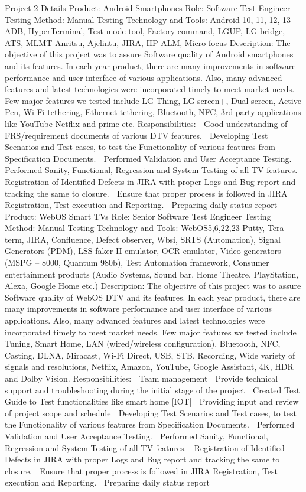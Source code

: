 Project 2 Details
Product: Android Smartphones Role: Software Test Engineer Testing Method: Manual Testing
Technology and Tools: Android 10, 11, 12, 13 ADB, HyperTerminal, Test mode tool, Factory command, LGUP, LG bridge, ATS, MLMT Anritsu, Ajelintu, JIRA, HP ALM, Micro focus
Description:
The objective of this project was to assure Software quality of Android smartphones and its features. In each year product, there are many improvements in software performance and user interface of various applications. Also, many advanced features and latest technologies were incorporated timely to meet market needs.
Few major features we tested include LG Thing, LG screen+, Dual screen, Active Pen, Wi-Fi tethering, Ethernet tethering, Bluetooth, NFC, 3rd party applications like YouTube Netflix and prime etc.
Responsibilities:
 Good understanding of FRS/requirement documents of various DTV features.
 Developing Test Scenarios and Test cases, to test the Functionality of various features from Specification Documents.
 Performed Validation and User Acceptance Testing.
 Performed Sanity, Functional, Regression and System Testing of all TV features.
 Registration of Identified Defects in JIRA with proper Logs and Bug report and tracking the same to closure.
 Ensure that proper process is followed in JIRA Registration, Test execution and Reporting.
 Preparing daily status report
Product: WebOS Smart TVs
Role: Senior Software Test Engineer
Testing Method: Manual Testing
Technology and Tools: WebOS5,6,22,23 Putty, Tera term, JIRA, Confluence, Defect observer, Wbsi, SRTS (Automation), Signal Generators (PDM), LSS faker II emulator, OCR emulator, Video generators (MSPG – 8000, Quantum 980b), Test Automation framework, Consumer entertainment products (Audio Systems, Sound bar, Home Theatre, PlayStation, Alexa, Google Home etc.)
Description:
The objective of this project was to assure Software quality of WebOS DTV and its features. In each year product, there are many improvements in software performance and user interface of various applications. Also, many advanced features and latest technologies were incorporated timely to meet market needs.
Few major features we tested include Tuning, Smart Home, LAN (wired/wireless configuration), Bluetooth, NFC, Casting, DLNA, Miracast, Wi-Fi Direct, USB, STB, Recording, Wide variety of signals and resolutions, Netflix, Amazon, YouTube, Google Assistant, 4K, HDR and Dolby Vision.
Responsibilities:
 Team management
 Provide technical support and troubleshooting during the initial stage of the project
 Created Test Guide to Test functionalities like smart home [IOT]
 Providing input and review of project scope and schedule
 Developing Test Scenarios and Test cases, to test the Functionality of various features from Specification Documents.
 Performed Validation and User Acceptance Testing.
 Performed Sanity, Functional, Regression and System Testing of all TV features.
 Registration of Identified Defects in JIRA with proper Logs and Bug report and tracking the same to closure.
 Ensure that proper process is followed in JIRA Registration, Test execution and Reporting.
 Preparing daily status report